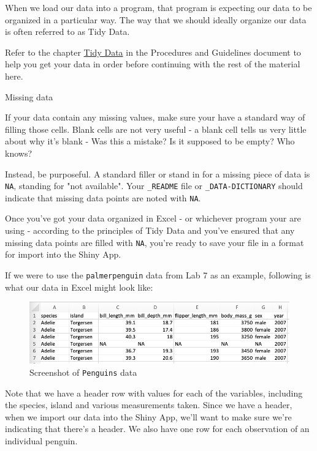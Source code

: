 \documentclass[
]{book}
\begin{document}
When we load our data into a program, that program is expecting our data to be organized in a particular way. The way that we should ideally organize our data is often referred to as Tidy Data.

Refer to the chapter \href{https://ubco-biology.github.io/Procedures-and-Guidelines/tidy-data.html}{Tidy Data} in the Procedures and Guidelines document to help you get your data in order before continuing with the rest of the material here.

Missing data

If your data contain any missing values, make sure your have a standard way of filling those cells. Blank cells are not very useful - a blank cell tells us very little about why it's blank - Was this a mistake? Is it supposed to be empty? Who knows?

Instead, be purposeful. A standard filler or stand in for a missing piece of data is \texttt{NA}, standing for "not available". Your \texttt{\_README} file or \texttt{\_DATA-DICTIONARY} should indicate that missing data points are noted with \texttt{NA}.

Once you've got your data organized in Excel - or whichever program your are using - according to the principles of Tidy Data and you've ensured that any missing data points are filled with \texttt{NA}, you're ready to save your file in a format for import into the Shiny App.

If we were to use the \texttt{palmerpenguin} data from Lab 7 as an example, following is what our data in Excel might look like:

\begin{figure}
\centering
\includegraphics{figures_images/Penguins-Excel.png}
\caption{Screenshot of \texttt{Penguins} data}
\end{figure}

Note that we have a header row with values for each of the variables, including the species, island and various measurements taken. Since we have a header, when we import our data into the Shiny App, we'll want to make sure we're indicating that there's a header. We also have one row for each observation of an individual penguin.
\end{document}
